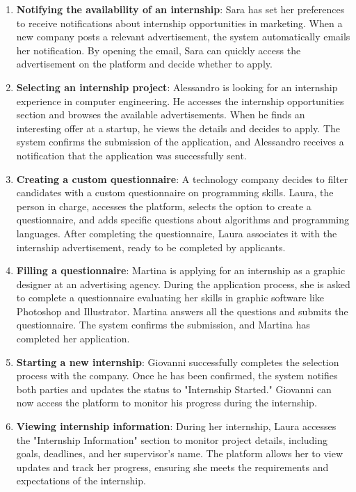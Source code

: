 \begin{enumerate}[label=\textbf{S\arabic* -}]
    \item \textbf {Notifying the availability of an internship}: 
    Sara has set her preferences to receive notifications about internship opportunities in marketing. 
    When a new company posts a relevant advertisement, the system automatically emails her notification. 
    By opening the email, Sara can quickly access the advertisement on the platform and decide whether to apply.
    \item \textbf {Selecting an internship project}: 
    Alessandro is looking for an internship experience in computer engineering. 
    He accesses the internship opportunities section and browses the available advertisements. 
    When he finds an interesting offer at a startup, he views the details and decides to apply. 
    The system confirms the submission of the application, and Alessandro receives a notification that the application was successfully sent.
    \item \textbf {Creating a custom questionnaire}: 
    A technology company decides to filter candidates with a custom questionnaire on programming skills. 
    Laura, the person in charge, accesses the platform, selects the option to create a questionnaire, and adds specific questions about algorithms and programming languages. 
    After completing the questionnaire, Laura associates it with the internship advertisement, ready to be completed by applicants.
    \item \textbf {Filling a questionnaire}: 
    Martina is applying for an internship as a graphic designer at an advertising agency. 
    During the application process, she is asked to complete a questionnaire evaluating her skills in graphic software like Photoshop and Illustrator. 
    Martina answers all the questions and submits the questionnaire. 
    The system confirms the submission, and Martina has completed her application.
    \item \textbf {Starting a new internship}: 
    Giovanni successfully completes the selection process with the company. 
    Once he has been confirmed, the system notifies both parties and updates the status to "Internship Started." 
    Giovanni can now access the platform to monitor his progress during the internship.
    \item \textbf {Viewing internship information}: 
    During her internship, Laura accesses the "Internship Information" section to monitor project details, including goals, deadlines, and her supervisor's name. 
    The platform allows her to view updates and track her progress, ensuring she meets the requirements and expectations of the internship.

\end{enumerate}

